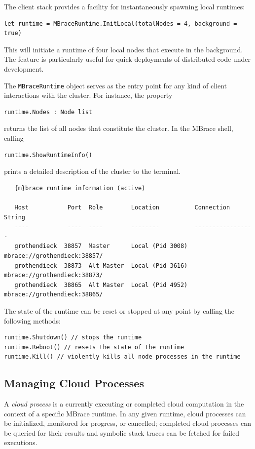 \documentclass[9pt,a4paper]{article}
\newcommand{\mbrace}{MBrace}
\begin{document}
The client stack provides a facility for instantaneously spawning local runtimes:
\begin{lstlisting}
let runtime = MBraceRuntime.InitLocal(totalNodes = 4, background = true)
\end{lstlisting}
This will initiate a runtime of four local nodes that execute in the background.
The feature is particularly useful for quick deployments of distributed code under development.

The \texttt{MBraceRuntime} object serves as the entry point for any kind of client interactions 
with the cluster. For instance, the property
\begin{lstlisting}
runtime.Nodes : Node list
\end{lstlisting}
returns the list of all nodes that constitute the cluster.
In the \mbrace{} shell, calling
\begin{lstlisting}
runtime.ShowRuntimeInfo()
\end{lstlisting}
prints a detailed description of the cluster to the terminal.
\begin{verbatim}
   {m}brace runtime information (active)                                               

   Host           Port  Role        Location          Connection String            
   ----           ----  ----        --------          -----------------            
   grothendieck  38857  Master      Local (Pid 3008)  mbrace://grothendieck:38857/ 
   grothendieck  38873  Alt Master  Local (Pid 3616)  mbrace://grothendieck:38873/ 
   grothendieck  38865  Alt Master  Local (Pid 4952)  mbrace://grothendieck:38865/ 
\end{verbatim}
The state of the runtime can be reset or stopped at any point by calling the following methods:
\begin{lstlisting}
runtime.Shutdown() // stops the runtime
runtime.Reboot() // resets the state of the runtime
runtime.Kill() // violently kills all node processes in the runtime
\end{lstlisting}

\subsection{Managing Cloud Processes}

A \emph{cloud process} is a currently executing or completed cloud computation in the context
of a specific \mbrace{} runtime. In any given runtime, cloud processes can be initialized,
monitored for progress, or cancelled; completed cloud processes can be queried for their results
and symbolic stack traces can be fetched for failed executions.
\end{document}
